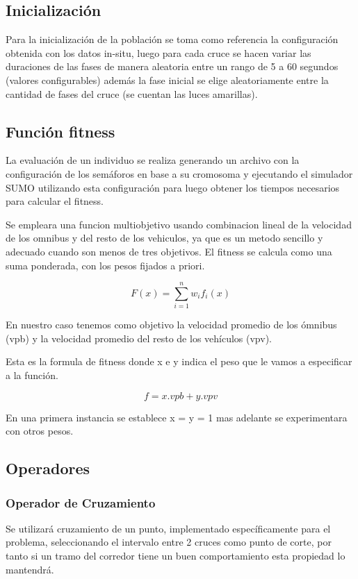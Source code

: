 \subsection{Inicialización}

Para la inicialización de la población se toma como referencia
la configuración obtenida con los datos in-situ, luego para cada
cruce se hacen variar las duraciones de las fases de manera aleatoria entre un rango de  5 a 60  segundos  (valores configurables)
además la fase inicial se elige aleatoriamente entre la cantidad de fases del cruce (se cuentan las luces amarillas).

\subsection{Función fitness}
La evaluación de un individuo se realiza generando un archivo con la configuración de los semáforos en base a su cromosoma y ejecutando el simulador SUMO utilizando esta configuración para luego obtener los tiempos necesarios para calcular el fitness.

Se empleara una funcion multiobjetivo usando combinacion lineal de la velocidad de los omnibus y del resto de los vehiculos, ya que es un metodo sencillo y adecuado cuando son menos de tres objetivos. El fitness se calcula como una suma ponderada, con los pesos fijados a priori.

        \begin{equation}
        \label{eq:funcion_fitness_generica}
		F(x) = \sum_{i=1}^{n}{w_i}{f_i}(x)
        \end{equation}

En nuestro caso tenemos como objetivo la velocidad promedio de los ómnibus (vpb) y la velocidad promedio del resto de los vehículos (vpv).

Esta es la formula de fitness donde x e y indica el peso que le vamos a especificar a la función. 

        \begin{equation}
        \label{eq:funcion_fitness}
        f = x.vpb + y.vpv
        \end{equation}
        
En una primera instancia se establece x = y = 1 mas adelante se experimentara con otros pesos.

\subsection{Operadores}
\subsubsection{Operador de Cruzamiento}
Se  utilizará cruzamiento  de  un  punto,  implementado
específicamente  para  el  problema,  seleccionando  el  intervalo
entre 2 cruces como punto de corte, por tanto si un tramo del corredor tiene un buen comportamiento esta propiedad lo mantendrá.


